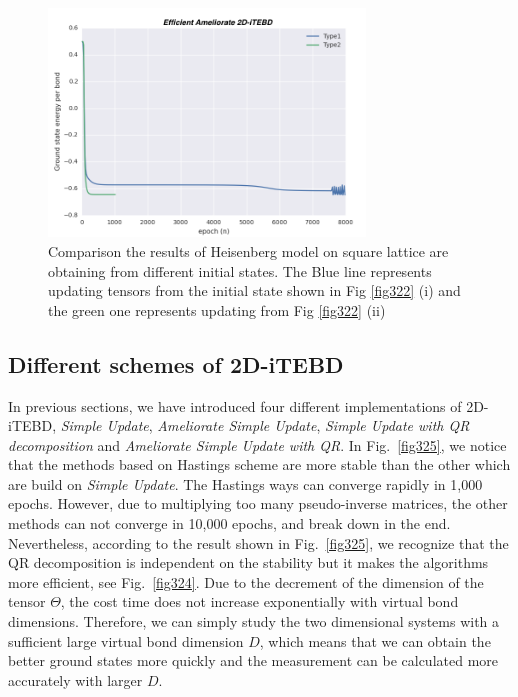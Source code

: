 \begin{figure}[ht]
	\centering
	\includegraphics[width=0.75\textwidth]{figures/fig323.png}
	\caption[Comparison the results of Heisenberg model on square lattice which are obtaining from different initial states.]{Comparison the results of Heisenberg model on square lattice are obtaining from different initial states. The Blue line represents updating tensors from the initial state shown in Fig \ref{fig322} (i) and the green one represents updating from Fig \ref{fig322} (ii)}

	\label{fig323}
\end{figure}

\subsection{Different schemes of 2D-iTEBD}

In previous sections, we have introduced four different implementations of 2D-iTEBD, \textit{Simple Update}, \textit{Ameliorate Simple Update}, \textit{Simple Update with QR decomposition} and \textit{Ameliorate Simple Update with QR}. In Fig.~\ref{fig325}, we notice that the methods based on Hastings scheme are more stable than the other which are build on \textit{Simple Update}. The Hastings ways can converge rapidly in 1,000 epochs. However, due to multiplying too many pseudo-inverse matrices, the other methods can not converge in 10,000 epochs, and break down in the end. Nevertheless, according to the result shown in Fig.~\ref{fig325}, we recognize that the QR decomposition is independent on the stability but it makes the algorithms more efficient, see Fig.~\ref{fig324}. Due to the decrement of the dimension of the tensor $\Theta$, the cost time does not increase exponentially with virtual bond dimensions. Therefore, we can simply study the two dimensional systems with a sufficient large virtual bond dimension $D$, which means that we can obtain the better ground states more quickly and the measurement can be calculated more accurately with larger $D$.

